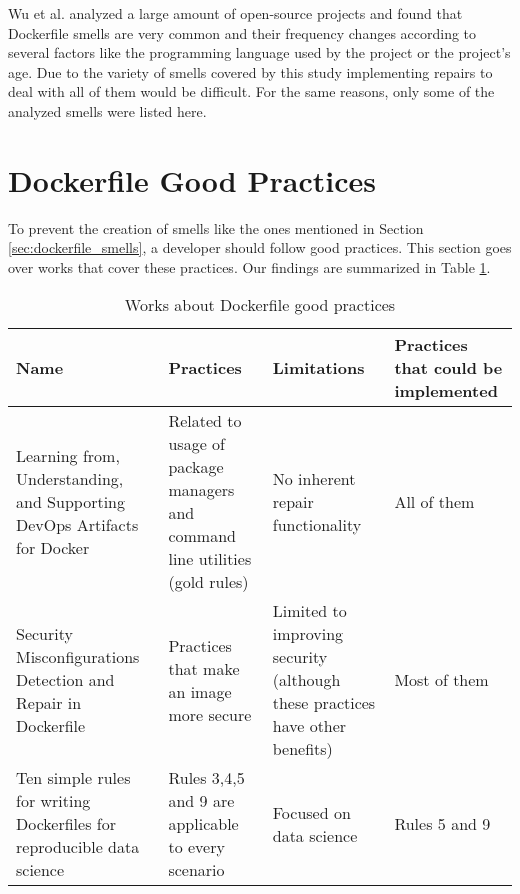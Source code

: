 Wu et al. \cite{wuCharacterizingOccurrenceDockerfile2020} analyzed a large amount of open-source projects and found that Dockerfile smells are very common and their frequency changes according to several factors like the programming language used by the project or the project's age. Due to the variety of smells covered by this study implementing repairs to deal with all of them would be difficult. For the same reasons, only some of the analyzed smells were listed here.

\section{Dockerfile Good Practices} \label{sec:dockerfile_good_practices}

To prevent the creation of smells like the ones mentioned in Section \ref{sec:dockerfile_smells}, a developer should follow good practices. This section goes over works that cover these practices. Our findings are summarized in Table \ref{tab:works_dockerfile_good_practices}.

\begin{table}[H]
    \centering
    \begin{tabular}{|p{}|p{}|p{}|p{}|}
        \hline \textbf{Name} & \textbf{Practices} & \textbf{Limitations} & \textbf{Practices that could be implemented} \\
        \hline Learning from, Understanding, and Supporting DevOps Artifacts for Docker \cite{henkelLearningUnderstandingSupporting2020} & Related to usage of package managers and command line utilities (gold rules) & No inherent repair functionality & All of them \\
        \hline Security Misconfigurations Detection and Repair in Dockerfile \cite{prinettoSecurityMisconfigurationsDetection} & Practices that make an image more secure & Limited to improving security (although these practices have other benefits) & Most of them \\
        \hline Ten simple rules for writing Dockerfiles for reproducible data science \cite{nustTenSimpleRules2020} & Rules 3,4,5 and 9 are applicable to every scenario & Focused on data science & Rules 5 and 9 \\
        \hline
    \end{tabular}
    \caption{Works about Dockerfile good practices}
    \label{tab:works_dockerfile_good_practices}
\end{table}

